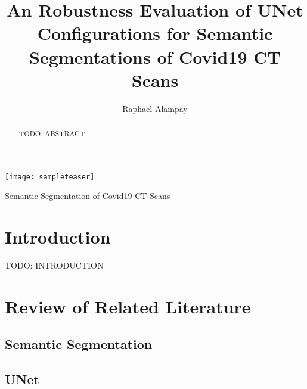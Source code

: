 \documentclass[acmsmall]{acmart}
\begin{document}
\title{An Robustness Evaluation of UNet Configurations for Semantic Segmentations of Covid19 CT Scans}

\author{Raphael Alampay}

\begin{abstract}
  TODO: ABSTRACT
\end{abstract}


\begin{teaserfigure}
  \texttt{[image: sampleteaser]}
  \caption{Semantic Segmentation of Covid19 CT Scans}
  \label{fig:teaser}
\end{teaserfigure}

\maketitle

\section{Introduction}

TODO: INTRODUCTION

\section{Review of Related Literature}

\subsection{Semantic Segmentation}

\subsection{UNet}
\end{document}
